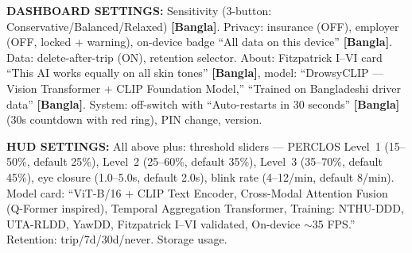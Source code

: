 \documentclass[sigconf]{acmart}
\begin{document}
\begin{promptbox}
\textbf{DASHBOARD SETTINGS:} Sensitivity (3-button: Conservative/Balanced/Relaxed) \textbf{[Bangla]}. Privacy: insurance (OFF), employer (OFF, locked + warning), on-device badge ``All data on this device'' \textbf{[Bangla]}. Data: delete-after-trip (ON), retention selector. About: Fitzpatrick I--VI card ``This AI works equally on all skin tones'' \textbf{[Bangla]}, model: ``DrowsyCLIP --- Vision Transformer + CLIP Foundation Model,'' ``Trained on Bangladeshi driver data'' \textbf{[Bangla]}. System: off-switch with ``Auto-restarts in 30 seconds'' \textbf{[Bangla]} (30s countdown with red ring), PIN change, version.
 
\textbf{HUD SETTINGS:} All above plus: threshold sliders --- PERCLOS Level~1 (15--50\%, default 25\%), Level~2 (25--60\%, default 35\%), Level~3 (35--70\%, default 45\%), eye closure (1.0--5.0s, default 2.0s), blink rate (4--12/min, default 8/min). Model card: ``ViT-B/16 + CLIP Text Encoder, Cross-Modal Attention Fusion (Q-Former inspired), Temporal Aggregation Transformer, Training: NTHU-DDD, UTA-RLDD, YawDD, Fitzpatrick I--VI validated, On-device $\sim$35 FPS.'' Retention: trip/7d/30d/never. Storage usage.
\end{promptbox}
 
\end{document}
